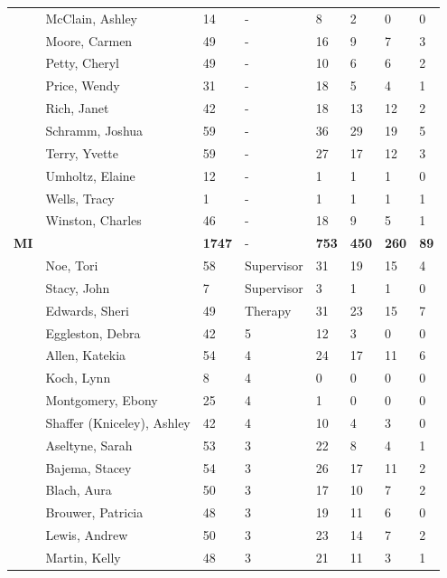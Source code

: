 \documentclass{article}\usepackage[]{graphicx}\usepackage[]{color}
\begin{document}
{\begin{longtable} { >{\raggedright}p{}p{}p{}p{}p{}p{}p{}p{}}
   & McClain, Ashley & 14 & - & 8 & 2 & 0 & 0 \\ 
   \rowcolor[gray]{0.90} & Moore, Carmen & 49 & - & 16 & 9 & 7 & 3 \\ 
   \rowcolor[gray]{0.90} & Petty, Cheryl & 49 & - & 10 & 6 & 6 & 2 \\ 
   \rowcolor[gray]{0.90} & Price, Wendy & 31 & - & 18 & 5 & 4 & 1 \\ 
   & Rich, Janet & 42 & - & 18 & 13 & 12 & 2 \\ 
   & Schramm, Joshua & 59 & - & 36 & 29 & 19 & 5 \\ 
   & Terry, Yvette & 59 & - & 27 & 17 & 12 & 3 \\ 
   \rowcolor[gray]{0.90} & Umholtz, Elaine & 12 & - & 1 & 1 & 1 & 0 \\ 
   \rowcolor[gray]{0.90} & Wells, Tracy & 1 & - & 1 & 1 & 1 & 1 \\ 
   \rowcolor[gray]{0.90} & Winston, Charles & 46 & - & 18 & 9 & 5 & 1 \\ 
   \hline
\textbf{MI} &  & \textbf{1747} & - & \textbf{753} & \textbf{450} & \textbf{260} & \textbf{89} \\ 
   & Noe, Tori & 58 & Supervisor & 31 & 19 & 15 & 4 \\ 
   & Stacy, John & 7 & Supervisor & 3 & 1 & 1 & 0 \\ 
   \rowcolor[gray]{0.90} & Edwards, Sheri & 49 & Therapy & 31 & 23 & 15 & 7 \\ 
   \rowcolor[gray]{0.90} & Eggleston, Debra & 42 & 5 & 12 & 3 & 0 & 0 \\ 
   \rowcolor[gray]{0.90} & Allen, Katekia & 54 & 4 & 24 & 17 & 11 & 6 \\ 
   & Koch, Lynn & 8 & 4 & 0 & 0 & 0 & 0 \\ 
   & Montgomery, Ebony & 25 & 4 & 1 & 0 & 0 & 0 \\ 
   & Shaffer (Kniceley), Ashley & 42 & 4 & 10 & 4 & 3 & 0 \\ 
   \rowcolor[gray]{0.90} & Aseltyne, Sarah & 53 & 3 & 22 & 8 & 4 & 1 \\ 
   \rowcolor[gray]{0.90} & Bajema, Stacey & 54 & 3 & 26 & 17 & 11 & 2 \\ 
   \rowcolor[gray]{0.90} & Blach, Aura & 50 & 3 & 17 & 10 & 7 & 2 \\ 
   & Brouwer, Patricia & 48 & 3 & 19 & 11 & 6 & 0 \\ 
   & Lewis, Andrew & 50 & 3 & 23 & 14 & 7 & 2 \\ 
   & Martin, Kelly & 48 & 3 & 21 & 11 & 3 & 1 \\ 

\end{longtable}}
\end{document}
